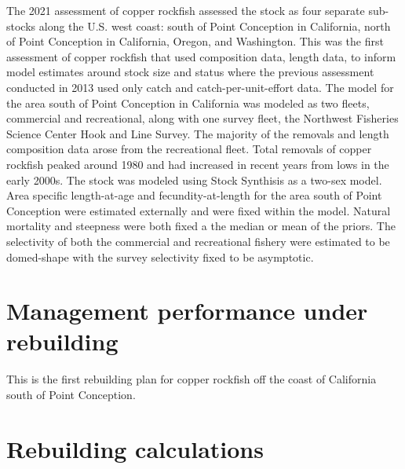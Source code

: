 \documentclass[11pt,
  english,
  a4paper,
]{article}
\begin{document}
The 2021 assessment of copper rockfish assessed the stock as four separate sub-stocks along the U.S. west coast: south of Point Conception in California, north of Point Conception in California, Oregon, and Washington. This was the first assessment of copper rockfish that used composition data, length data, to inform model estimates around stock size and status where the previous assessment conducted in 2013 used only catch and catch-per-unit-effort data. The model for the area south of Point Conception in California was modeled as two fleets, commercial and recreational, along with one survey fleet, the Northwest Fisheries Science Center Hook and Line Survey. The majority of the removals and length composition data arose from the recreational fleet. Total removals of copper rockfish peaked around 1980 and had increased in recent years from lows in the early 2000s. The stock was modeled using Stock Synthisis as a two-sex model. Area specific length-at-age and fecundity-at-length for the area south of Point Conception were estimated externally and were fixed within the model. Natural mortality and steepness were both fixed a the median or mean of the priors. The selectivity of both the commercial and recreational fishery were estimated to be domed-shape with the survey selectivity fixed to be asymptotic.

\leavevmode\tagmcend\tagstructend\par


\hypertarget{management-performance-under-rebuilding}{%
\section{Management performance under rebuilding}\label{management-performance-under-rebuilding}}

\leavevmode\tagmcend\tagstructend


This is the first rebuilding plan for copper rockfish off the coast of California south of Point Conception.

\leavevmode\tagmcend\tagstructend\par


\hypertarget{rebuilding-calculations}{%
\section{Rebuilding calculations}\label{rebuilding-calculations}}
\end{document}
